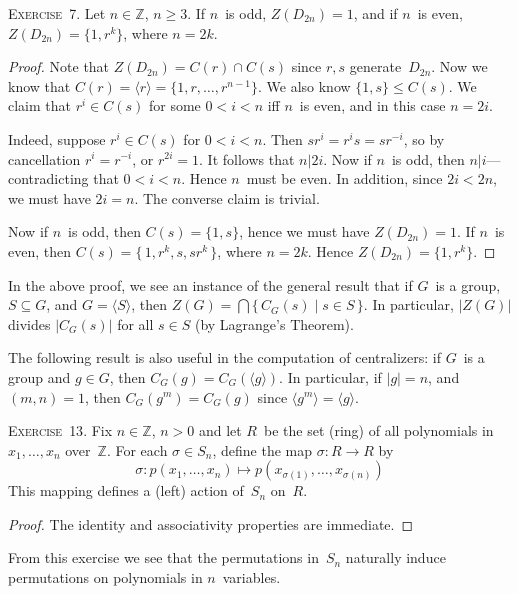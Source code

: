 \documentclass[letterpaper]{article}
\newcommand{\exercise}[1]{\goodbreak\noindent\textsc{Exercise~{#1}.}}
\newcommand{\Z}{\mathbb{Z}}
\newcommand{\sect}{\cap}
\newcommand{\bigsect}{\bigcap}
\newcommand{\subgroup}{\le}
\newcommand{\ord}[1]{|{#1}|}
\newcommand{\gen}[1]{\langle{#1}\rangle}
\begin{document}
\exercise{7}
Let $n\in\Z$, $n\ge3$. If $n$~is odd, $Z(D_{2n})=1$, and if $n$~is even, $Z(D_{2n})=\{1,r^k\}$, where $n=2k$.
\begin{proof}
Note that $Z(D_{2n})=C(r)\sect C(s)$ since $r,s$ generate~$D_{2n}$. Now we know that $C(r)=\gen{r}=\{1,r,\ldots,r^{n-1}\}$. We also know $\{1,s\}\subgroup C(s)$. We claim that $r^i\in C(s)$ for some $0<i<n$ iff $n$~is even, and in this case $n=2i$.

Indeed, suppose $r^i\in C(s)$ for $0<i<n$. Then $sr^i=r^is=sr^{-i}$, so by cancellation $r^i=r^{-i}$, or $r^{2i}=1$. It follows that $n|2i$. Now if $n$~is odd, then $n|i$---contradicting that $0<i<n$. Hence $n$~must be even. In addition, since $2i<2n$, we must have $2i=n$. The converse claim is trivial.

Now if $n$~is odd, then $C(s)=\{1,s\}$, hence we must have $Z(D_{2n})=1$. If $n$~is even, then $C(s)=\{\,1,r^k,s,sr^k\,\}$, where $n=2k$. Hence $Z(D_{2n})=\{1,r^k\}$.
\end{proof}

\noindent In the above proof, we see an instance of the general result that if $G$~is a group, $S\subseteq G$, and $G=\gen{S}$, then $Z(G)=\bigsect\{\,C_G(s)\mid s\in S\,\}$. In particular, $\ord{Z(G)}$ divides $\ord{C_G(s)}$ for all $s\in S$ (by Lagrange's Theorem).

The following result is also useful in the computation of centralizers: if $G$~is a group and $g\in G$, then $C_G(g)=C_G(\gen{g})$. In particular, if $\ord{g}=n$, and $(m,n)=1$, then $C_G(g^m)=C_G(g)$ since $\gen{g^m}=\gen{g}$.

\bigskip
\exercise{13}
Fix $n\in\Z$, $n>0$ and let $R$~be the set (ring) of all polynomials in $x_1,\ldots,x_n$ over~$\Z$. For each $\sigma\in S_n$, define the map $\sigma:R\to R$ by
$$\sigma:p(x_1,\ldots,x_n)\mapsto p(x_{\sigma(1)},\ldots,x_{\sigma(n)})$$
This mapping defines a (left) action of~$S_n$ on~$R$.
\begin{proof}
The identity and associativity properties are immediate.
\end{proof}
\noindent From this exercise we see that the permutations in~$S_n$ naturally induce permutations on polynomials in $n$~variables.
\end{document}
